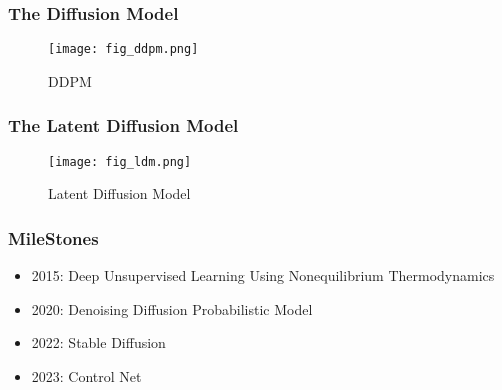 \begin{frame}
    \frametitle{The Diffusion Model}
    \begin{figure}
        \texttt{[image: fig\_ddpm.png]}
        \caption{DDPM \cite{hoDenoisingDiffusionProbabilistic2020}}
    \end{figure}
\end{frame}

\begin{frame}
    \frametitle{The Latent Diffusion Model}
    \begin{figure}
        \texttt{[image: fig\_ldm.png]}
        \caption{Latent Diffusion Model \cite{rombachHighResolutionImageSynthesis2022}}
    \end{figure}
\end{frame}

\begin{frame}
    \frametitle{MileStones}
    \begin{itemize}
        \item 2015: Deep Unsupervised Learning Using Nonequilibrium Thermodynamics \cite{sohl-dicksteinDeepUnsupervisedLearning2015}
        \item 2020: Denoising Diffusion Probabilistic Model \cite{hoDenoisingDiffusionProbabilistic2020}
        \item 2022: Stable Diffusion \cite{rombachHighResolutionImageSynthesis2022}
        \item 2023: Control Net \cite{zhangAddingConditionalControl2023}
    \end{itemize}
\end{frame}

